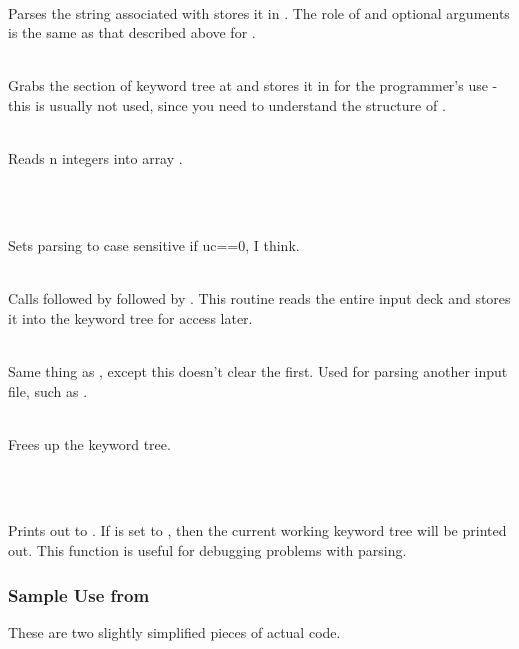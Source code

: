 \\
Parses the string associated with  stores it in .
The role of  and optional arguments is the same as that
described above for .

 \\
Grabs the section of keyword tree at  and stores it in 
for the programmer's use - this is usually not used, since you need to 
understand the structure of .

 \\
Reads n integers into array .

\begin{center}  \\ \end{center}

 \\
Sets parsing to case sensitive if uc==0, I think.

 \\
Calls  followed by  followed by 
.  This routine reads the entire input deck
and stores it into the keyword tree for access later.

 \\
Same thing as , except this doesn't clear the 
 first.  Used for parsing another input file, such 
as .

 \\
Frees up the keyword tree.

\begin{center}  \\ \end{center}

 \\
Prints out  to . If  is set to ,
then the current working keyword tree will be printed out.
This function is useful for debugging problems with parsing.

\subsubsection{Sample Use from \PSIcscf}
These are two slightly simplified pieces of actual code.

